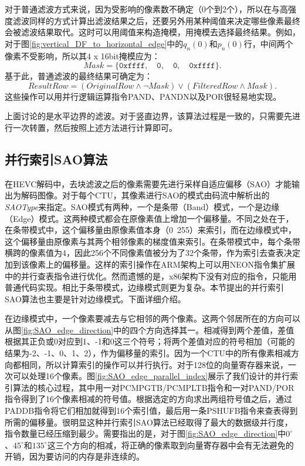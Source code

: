 对于普通滤波方式来说，因为受影响的像素数不确定（0个到2个），所以在与高强度滤波同样的方式计算出滤波结果之后，还要另外用某种阈值来决定哪些像素最终会被滤波结果取代。这时可以用阈值来构造掩模，用掩模去选择最终结果。例如，对于图\ref{fig:vertical_DF_to_horizontal_edge}中的$q_n(0)$和$p_n(0)$行，中间两个像素不受影响，所以其4 x 16bit掩模应为：
\begin{equation}
Mask = \{ \texttt{0xffff}, \quad \texttt{0}, \quad \texttt{0}, \quad \texttt{0xffff} \}.
\end{equation}
基于此，普通滤波的最终结果可确定为：
\begin{equation}
ResultRow = (OriginalRow \land \neg Mask ) \lor (FilteredRow \land Mask).
\end{equation}
这些操作可以用并行逻辑运算指令PAND、PANDN以及POR很轻易地实现。

上面讨论的是水平边界的滤波。对于竖直边界，该算法过程是一致的，只需要先进行一次转置，然后按照上述方法进行计算即可。

\subsection{并行索引SAO算法}

在HEVC解码中，去块滤波之后的像素需要先进行采样自适应偏移（SAO）才能输出为解码图像。对于每个CTU，其像素进行SAO的模式由码流中解析出的\textit{SAOType}来指定。SAO模式有两种，一个是条带（Band）模式，一个是边缘（Edge）模式。这两种模式都会在原像素值上增加一个偏移量。不同之处在于，在条带模式中，这个偏移量由原像素值本身（0~255）来索引，而在边缘模式中，这个偏移量由原像素与其两个相邻像素的梯度值来索引。在条带模式中，每个条带横跨的像素值为4，因此256个不同像素值被分为了32个条带，作为索引去查表决定加到该像素上的偏移量。这样的索引操作在ARM架构上可以用NEON指令集扩展中的并行查表指令进行优化。然而遗憾的是，x86架构下没有对应的指令，只能用普通代码实现。相比于条带模式，边缘模式则更为复杂。本节提出的并行索引SAO算法也主要是针对边缘模式。下面详细介绍。

在边缘模式中，一个像素要减去与它相邻的两个像素。这两个邻居所在的方向可以从图\ref{fig:SAO_edge_direction}中的四个方向选择其一。相减得到两个差值，差值根据其正负或0对应到1、-1和0这三个符号；将两个差值对应的符号相加（可能的结果为-2、-1、0、1、2），作为偏移量的索引。因为一个CTU中的所有像素相减方向都相同，所以计算索引的操作可以并行执行。对于128位的向量寄存器来说，一次可以处理16个像素。图\ref{fig:SAO_edge_parallel_index}展示了我们设计的并行索引算法的核心过程，其中用一对PCMPGTB/PCMPLTB指令和一对PAND/POR指令得到了16个像素相减的符号值。根据选定的方向求出两组符号值之后，通过PADDB指令将它们相加就得到16个索引值，最后用一条PSHUFB指令来查表得到所需的偏移量。很明显这种并行索引SAO算法已经取得了最大的数据级并行度，指令数量已经压缩到最少。需要指出的是，对于图\ref{fig:SAO_edge_direction}中$0^\circ$、$45^\circ$和$135^\circ$这三个方向的相减，将正确的像素取到向量寄存器中会有无法避免的开销，因为要访问的内存是非连续的。

